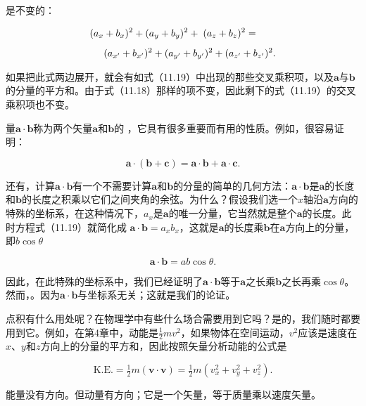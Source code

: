 \documentclass[12pt,oneside]{book}
\providecommand{\FLPvec}[1]{\boldsymbol{#1}}
\providecommand{\FLPa}[0]{\FLPvec{a}}
\providecommand{\FLPb}[0]{\FLPvec{b}}
\providecommand{\FLPc}[0]{\FLPvec{c}}
\providecommand{\FLPv}[0]{\FLPvec{v}}
\begin{document}
是不变的：


\begin{align}
(a_x &+ b_x)^2 + (a_y + b_y)^2 +\;(a_z + b_z)^2 = \notag\\[1ex]
\label{Eq:I:11:20}
&(a_{x'} + b_{x'})^2 + (a_{y'} + b_{y'})^2 + (a_{z'} + b_{z'})^2.
\end{align}

如果把此式两边展开，就会有如式（11.19）中出现的那些交叉乘积项，以及$\boldsymbol{a}$与$\boldsymbol{b}$的分量的平方和。由于式（11.18）那样的项不变，因此剩下的式（11.19）的交叉乘积项也不变。


量$\boldsymbol{a} \cdot \boldsymbol{b}$称为两个矢量$\boldsymbol{a}$和$\boldsymbol{b}$的 ，它具有很多重要而有用的性质。例如，很容易证明：

\begin{equation}
\label{Eq:I:11:21}
\FLPa\cdot(\FLPb+\FLPc)=\FLPa\cdot\FLPb+\FLPa\cdot\FLPc.
\end{equation}

还有，计算$\boldsymbol{a} \cdot \boldsymbol{b}$有一个不需要计算$\boldsymbol{a}$和$\boldsymbol{b}$的分量的简单的几何方法：$\boldsymbol{a} \cdot \boldsymbol{b}$是$\boldsymbol{a}$的长度和$\boldsymbol{b}$的长度之积乘以它们之间夹角的余弦。为什么？假设我们选一个$x$轴沿$\boldsymbol{a}$方向的特殊的坐标系，在这种情况下，$a_x$是$\boldsymbol{a}$的唯一分量，它当然就是整个$\boldsymbol{a}$的长度。此时方程式（11.19）就简化成 $ \FLPa\cdot\FLPb =
a_xb_x $，这就是$ \FLPa $的长度乘$ \FLPb $在$ \FLPa $方向上的分量，即$ b\cos\theta $

\begin{equation*}
\FLPa\cdot\FLPb=ab\cos\theta.
\end{equation*}

因此，在此特殊的坐标系中，我们已经证明了$ \FLPa\cdot\FLPb $等于$ \FLPa $之长乘$ \FLPb $之长再乘$ \cos\theta $。然而，。因为$ \FLPa\cdot\FLPb $与坐标系无关；这就是我们的论证。

点积有什么用处呢？在物理学中有些什么场合需要用到它吗？是的，我们随时都要用到它。例如，在第4章中，动能是$ \tfrac{1}{2}mv^2 $，如果物体在空间运动，$ v^{2} $应该是速度在$ x $、$ y $和$ z $方向上的分量的平方和，因此按照矢量分析动能的公式是

\begin{equation}
\label{Eq:I:11:22}
\text{K.E.}=\tfrac{1}{2}m(\FLPv\cdot\FLPv)=\tfrac{1}{2}m
(v_x^2+v_y^2+v_z^2).
\end{equation}

能量没有方向。但动量有方向；它是一个矢量，等于质量乘以速度矢量。
\end{document}
